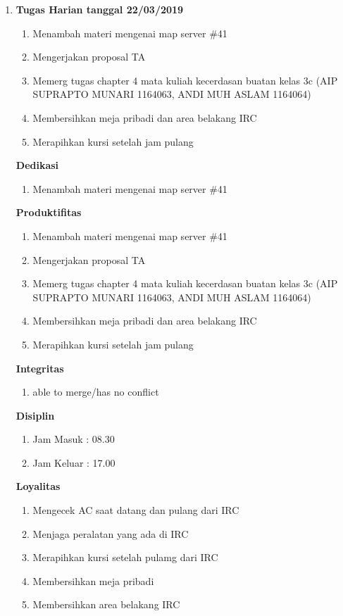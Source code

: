 \begin{enumerate}
\item \textbf{Tugas Harian tanggal 22/03/2019}
\begin{enumerate}
\item Menambah materi mengenai map server \#41
\item Mengerjakan proposal TA
\item Memerg tugas chapter 4 mata kuliah kecerdasan buatan kelas 3c (AIP SUPRAPTO MUNARI 1164063, ANDI MUH ASLAM 1164064)
\item Membersihkan meja pribadi dan area belakang IRC
\item Merapihkan kursi setelah jam pulang 
\end{enumerate}

\textbf{Dedikasi}
\begin{enumerate}
\item Menambah materi mengenai map server \#41
\end{enumerate}

\textbf{Produktifitas}
\begin{enumerate}
\item Menambah materi mengenai map server \#41
\item Mengerjakan proposal TA
\item Memerg tugas chapter 4 mata kuliah kecerdasan buatan kelas 3c (AIP SUPRAPTO MUNARI 1164063, ANDI MUH ASLAM 1164064)
\item Membersihkan meja pribadi dan area belakang IRC
\item Merapihkan kursi setelah jam pulang 
\end{enumerate}

\textbf{Integritas}
\begin{enumerate}
\item able to merge/has no conflict
\end{enumerate}

\textbf{Disiplin}
\begin{enumerate}
\item Jam Masuk : 08.30
\item Jam Keluar : 17.00
\end{enumerate}

\textbf{Loyalitas}
\begin{enumerate}
\item Mengecek AC saat datang dan pulang dari IRC
\item Menjaga peralatan yang ada di IRC
\item Merapihkan kursi setelah pulamg dari IRC
\item Membersihkan meja pribadi
\item Membersihkan area belakang IRC
\end{enumerate}



\end{enumerate}
